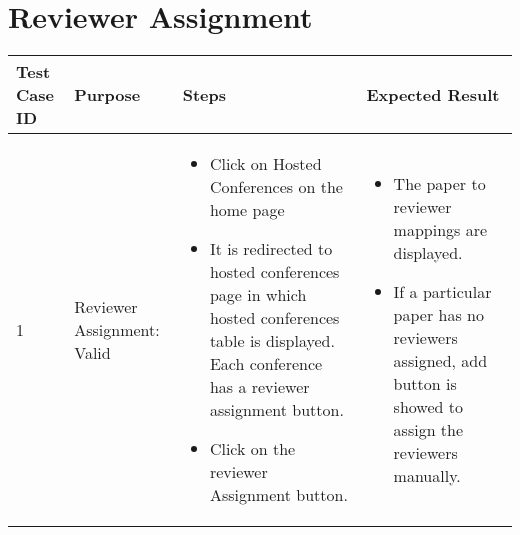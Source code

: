 \documentclass[english,a4paper,12pt]{report}
\begin{document}
\section{Reviewer Assignment}
\begin{longtable} { | p{2cm} | p{3cm}| p{6cm}| p{6cm} |} 
\hline 
\textbf{Test Case ID} & \textbf{Purpose}  & \textbf{Steps} &\textbf{Expected Result} \\
\hline 1 &  Reviewer Assignment: Valid &  
\vspace{-5mm}
\begin{itemize}
\item Click on Hosted Conferences on the home page
\item It is redirected to hosted conferences page in which hosted conferences table is displayed. Each conference has a reviewer assignment button.
\item Click on the reviewer Assignment button.
\end{itemize}&
\vspace{-5mm}
\begin{itemize}
\item The paper to reviewer mappings are displayed.
\item If a particular paper has no reviewers assigned, add button is showed to assign the reviewers manually.
\end{itemize}\\

\hline
\end{longtable}
\end{document}
